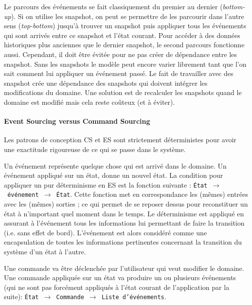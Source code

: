 Le parcours des événements se fait classiquement du premier au dernier 
(\textit{bottom-up}). Si on utilise les \gls{snapshot}, on peut se permettre de les 
parcourir dans l'autre sens (\textit{top-bottom}) jusqu'à trouver un \gls{snapshot} 
puis appliquer tous les événements qui sont arrivés entre ce \gls{snapshot} et 
l'état courant. Pour accéder à des données historiques 
plus anciennes que le dernier \gls{snapshot}, le second parcours fonctionne 
aussi. Cependant, il doit être évitée pour ne pas créer de dépendance entre 
les \gls{snapshot}. Sans les snapshots le modèle peut encore varier 
\og librement \fg{} tant que l'on sait comment lui appliquer un événement passé. 
Le fait de travailler avec des \gls{snapshot} crée une dépendance des 
snapshots qui doivent intégrer les modifications du domaine. Une solution est 
de recalculer les snapshots quand le domaine est modifié mais cela reste 
coûteux (et à éviter).

\paragraph{Event Sourcing versus Command Sourcing}
\label{sec:es-vs-cs}
Les patrons de conception \gls{CS} et \gls{ES} sont strictement déterministes pour 
avoir une exactitude rigoureuse de ce qui se passe dans le système.

Un événement représente quelque chose qui est arrivé dans le domaine. Un 
événement appliqué sur un état, donne un nouvel état. 
La condition pour appliquer un pur déterminisme en \gls{ES} est la fonction 
suivante : \texttt{État~$\rightarrow$~événement~$\rightarrow$~État}. 
Cette fonction met en correspondance les (mêmes) entrées avec les (mêmes) 
sorties ; ce qui permet de se reposer dessus pour reconstituer un état à 
n'important quel moment dans le temps. 
Le déterminisme est appliqué en assurant à l'événement tous les 
informations lui permettant de faire la transition (i.e. sans effet de bord). 
L'événement est alors considéré comme une encapsulation de toutes les 
informations pertinentes concernant la transition du système d'un état à l'autre.

Une commande va être déclenchée par l'utilisateur qui veut modifier le domaine. 
Une commande appliquée sur un état va produire un ou plusieurs événements (qui 
ne sont pas forcément appliqués à l'état courant de l'application par la suite): 
\texttt{État~$\rightarrow$~Commande $\rightarrow$~Liste d'événements}.

